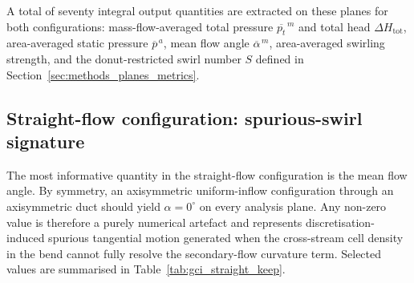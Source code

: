 A total of seventy integral output quantities are extracted on these planes for both configurations: mass-flow-averaged total pressure $\overline{p_t}^{\,m}$ and total head $\Delta H_{\mathrm{tot}}$, area-averaged static pressure $\overline{p}^{\,a}$, mean flow angle $\overline{\alpha}^{\,m}$, area-averaged swirling strength, and the donut-restricted swirl number $S$ defined in Section~\ref{sec:methods_planes_metrics}.

\subsection{Straight-flow configuration: spurious-swirl signature}
\label{sec:gci_straight}

The most informative quantity in the straight-flow configuration is the mean flow angle. By symmetry, an axisymmetric uniform-inflow configuration through an axisymmetric duct should yield $\alpha = 0^\circ$ on every analysis plane. Any non-zero value is therefore a purely numerical artefact and represents discretisation-induced spurious tangential motion generated when the cross-stream cell density in the bend cannot fully resolve the secondary-flow curvature term. Selected values are summarised in Table~\ref{tab:gci_straight_keep}.

